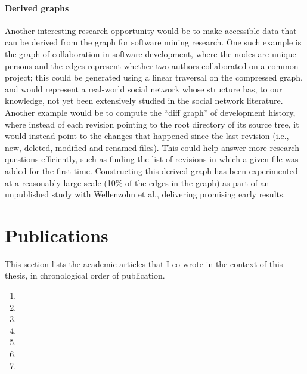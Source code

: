 \paragraph*{Derived graphs}

Another interesting research opportunity would be to make accessible data
that can be derived from the graph for software mining research. One such
example is the graph of collaboration in software development, where the nodes
are unique persons and the edges represent whether two authors collaborated on
a common project; this could be generated using a linear traversal on the
compressed graph, and would represent a real-world social network whose
structure has, to our knowledge, not yet been extensively studied in the
social network literature. Another example would be to compute the ``diff
graph'' of development history, where instead of each revision pointing to the
root directory of its source tree, it would instead point to the changes that
happened since the last revision (i.e., new, deleted, modified and renamed
files). This could help answer more research questions efficiently, such as
finding the list of revisions in which a given file was added for the first
time. Constructing this derived graph has been experimented at a reasonably
large scale (10\% of the edges in the graph) as part of an unpublished study
with Wellenzohn et al., delivering promising early results.

\section{Publications}

This section lists the academic articles that I co-wrote in the context of this
thesis, in chronological order of publication.

\begin{enumerate}
    \item {}
    \item {}
    \item {}
    \item {}
    \item {}
    \item {}
    \item {}
\end{enumerate}
